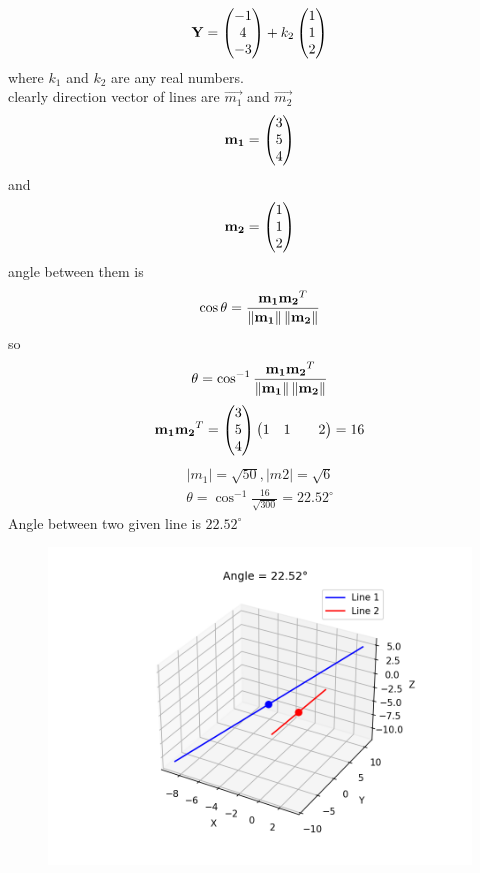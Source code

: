 \documentclass[12pt]{article}
\begin{document}
\begin{align}
    \Vec{Y} = \myvec{-1\\4\\-3} + k_2\myvec{1\\1\\2}
\end{align}
where $k_1$ and $k_2$ are any real numbers.\\
clearly direction vector of lines are $\vec{m_1}$ and $\vec{m_2}$
\begin{align}
    \mathbf{m_1}=\begin{pmatrix}3\\5\\4\end{pmatrix} 
\end{align}
and
\begin{align}
     \mathbf{m_2}=\begin{pmatrix}1\\1\\2\end{pmatrix}
\end{align}
angle between them is 
\begin{align}
    \cos{\theta}=\frac{\mathbf{m_1}\mathbf{m_2}^T}{\left\lVert\mathbf{m_1}\right\rVert\left\lVert\mathbf{m_2}\right\rVert}
\end{align}
so 
\begin{align}
    \theta=\cos^{-1}{\frac{\mathbf{m_1}\mathbf{m_2}^T}{\left\lVert\mathbf{m_1}\right\rVert\left\lVert\mathbf{m_2}\right\rVert}}
\end{align}
\begin{align}
    \mathbf{m_1}\mathbf{m_2}^T=\begin{pmatrix}3 \\ 5 \\ 4\end{pmatrix}\begin{pmatrix}1&1&&2\end{pmatrix}=16
\end{align}
\begin{align}
    |m_1|=\sqrt{50}, |m2|=\sqrt{6}
\end{align}
\begin{align}
    \theta=\cos^{-1}{\frac{16}{\sqrt{300}}}=22.52^{\circ}
    \end{align}
Angle between two given line is $22.52^{\circ}$
\begin{figure}[h]
    \centering
    \includegraphics[width=1.2\linewidth]{figures/lines3d.png}
    \caption{}
    \label{}
\end{figure}
\end{document}
